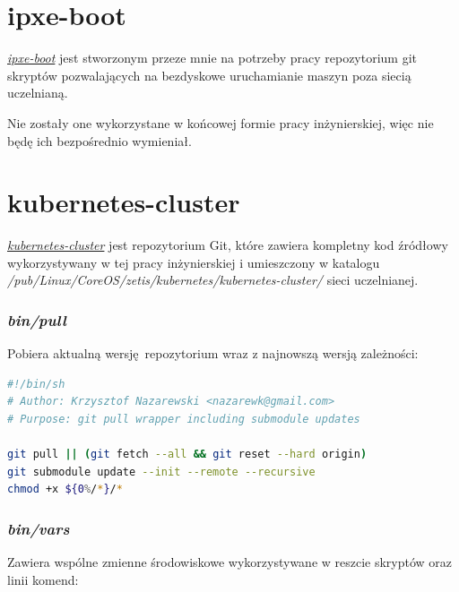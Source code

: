 \documentclass[a4paper,12pt,twoside,openany]{report}
\begin{document}
\hypertarget{ipxe-boot}{%
\section{ipxe-boot}\label{ipxe-boot}}

\href{https://github.com/nazarewk/ipxe-boot}{\emph{ipxe-boot}} jest
stworzonym przeze mnie na potrzeby pracy repozytorium git skryptów
pozwalających na bezdyskowe uruchamianie maszyn poza siecią uczelnianą.

Nie zostały one wykorzystane w końcowej formie pracy inżynierskiej, więc
nie będę ich bezpośrednio wymieniał.

\hypertarget{kubernetes-cluster}{%
\section{kubernetes-cluster}\label{kubernetes-cluster}}

\href{https://github.com/nazarewk/kubernetes-cluster}{\emph{kubernetes-cluster}}
jest repozytorium Git, które zawiera kompletny kod źródłowy
wykorzystywany w tej pracy inżynierskiej i umieszczony w katalogu
\emph{/pub/Linux/CoreOS/zetis/kubernetes/kubernetes-cluster/} sieci
uczelnianej.

\newpage

\hypertarget{binpull}{%
\subsubsection{\texorpdfstring{\emph{bin/pull}}{bin/pull}}\label{binpull}}

Pobiera aktualną wersję~repozytorium wraz z najnowszą wersją zależności:

\begin{lstlisting}[language=bash]
#!/bin/sh
# Author: Krzysztof Nazarewski <nazarewk@gmail.com>
# Purpose: git pull wrapper including submodule updates

git pull || (git fetch --all && git reset --hard origin)
git submodule update --init --remote --recursive
chmod +x ${0%/*}/*
\end{lstlisting}

\hypertarget{binvars}{%
\subsubsection{\texorpdfstring{\emph{bin/vars}}{bin/vars}}\label{binvars}}

Zawiera wspólne zmienne środowiskowe wykorzystywane w reszcie skryptów
oraz linii komend:
\end{document}

